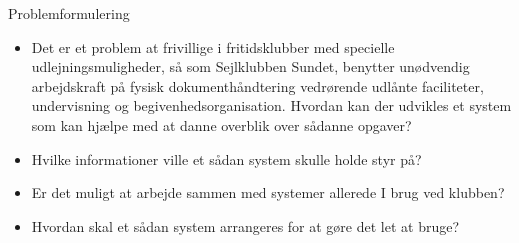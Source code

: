 \begin{frame}{Problemformulering}
  \begin{itemize}
    \item Det er et problem at frivillige i fritidsklubber med specielle udlejningsmuligheder, så som Sejlklubben Sundet, benytter unødvendig arbejdskraft på fysisk dokumenthåndtering vedrørende udlånte faciliteter, undervisning og begivenhedsorganisation. Hvordan kan der udvikles et system som kan hjælpe med at danne overblik over sådanne opgaver?
    \item Hvilke informationer ville et sådan system skulle holde styr på?
    \item Er det muligt at arbejde sammen med systemer allerede I brug ved klubben?
    \item Hvordan skal et sådan system arrangeres for at gøre det let at bruge?
  \end{itemize}
\end{frame}